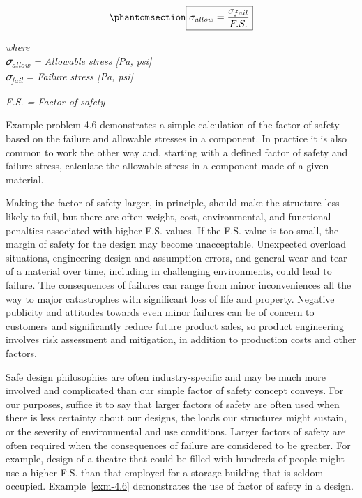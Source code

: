 \documentclass[
  letterpaper,
  DIV=11,
  numbers=noendperiod]{scrreprt}
\theoremstyle{definition}
\theoremstyle{remark}
\begin{document}
\begin{equation}\phantomsection\label{eq-4.9}{
\boxed{\sigma_{allow}=\frac{\sigma_{fail}}{F . S .}}
}\end{equation}

\emph{where}\\
\emph{𝜎\textsubscript{allow} = Allowable stress {[}Pa, psi{]}}\\
\emph{𝜎\textsubscript{fail} = Failure stress {[}Pa, psi{]}}

\emph{F.S. = Factor of safety}

Example problem 4.6 demonstrates a simple calculation of the factor of
safety based on the failure and allowable stresses in a component. In
practice it is also common to work the other way and, starting with a
defined factor of safety and failure stress, calculate the allowable
stress in a component made of a given material.

Making the factor of safety larger, in principle, should make the
structure less likely to fail, but there are often weight, cost,
environmental, and functional penalties associated with higher F.S.
values. If the F.S. value is too small, the margin of safety for the
design may become unacceptable. Unexpected overload situations,
engineering design and assumption errors, and general wear and tear of a
material over time, including in challenging environments, could lead to
failure. The consequences of failures can range from minor
inconveniences all the way to major catastrophes with significant loss
of life and property. Negative publicity and attitudes towards even
minor failures can be of concern to customers and significantly reduce
future product sales, so product engineering involves risk assessment
and mitigation, in addition to production costs and other factors.

Safe design philosophies are often industry-specific and may be much
more involved and complicated than our simple factor of safety concept
conveys. For our purposes, suffice it to say that larger factors of
safety are often used when there is less certainty about our designs,
the loads our structures might sustain, or the severity of environmental
and use conditions. Larger factors of safety are often required when the
consequences of failure are considered to be greater. For example,
design of a theatre that could be filled with hundreds of people might
use a higher F.S. than that employed for a storage building that is
seldom occupied. Example~\ref{exm-4.6} demonstrates the use of factor of
safety in a design.
\end{document}
